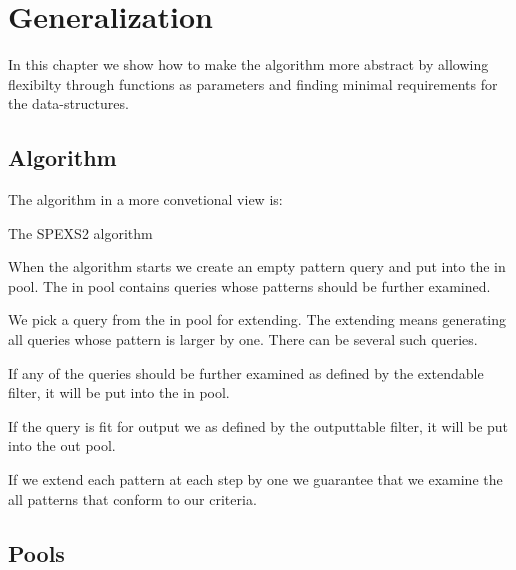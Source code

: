\chapter{Generalization}

In this chapter we show how to make the algorithm more 
abstract by allowing flexibilty through functions as parameters and
finding minimal requirements for the data-structures.

\section{Algorithm}

The algorithm in a more convetional view is:

\begin{algorithm}[H]
	\caption{The SPEXS2 algorithm}
\begin{algorithmic}[1]
			\EndIf
			\EndIf
		\EndFor
	\EndWhile
\end{algorithmic}
\end{algorithm}

When the algorithm starts we create an empty pattern query and put 
into the in pool. The in pool contains queries whose patterns
should be further examined.

We pick a query from the in pool for extending. The extending means
generating all queries whose pattern is larger by one. There can be
several such queries.

If any of the queries should be further examined as defined by the
extendable filter, it will be put into the in pool.

If the query is fit for output we as defined by the outputtable filter,
it will be put into the out pool.

If we extend each pattern at each step by one we guarantee that we
examine the all patterns that conform to our criteria.

\section{Pools}

